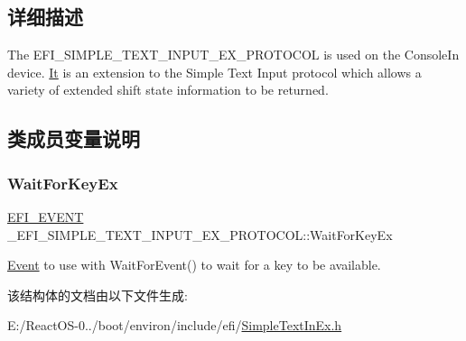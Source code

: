 \subsection{详细描述}
The E\+F\+I\+\_\+\+S\+I\+M\+P\+L\+E\+\_\+\+T\+E\+X\+T\+\_\+\+I\+N\+P\+U\+T\+\_\+\+E\+X\+\_\+\+P\+R\+O\+T\+O\+C\+OL is used on the Console\+In device. \hyperlink{class_it}{It} is an extension to the Simple Text Input protocol which allows a variety of extended shift state information to be returned. 

\subsection{类成员变量说明}
\mbox{\label{struct___e_f_i___s_i_m_p_l_e___t_e_x_t___i_n_p_u_t___e_x___p_r_o_t_o_c_o_l_a0279ca14f011ec16c3776440e3902235}} 
\subsubsection{\texorpdfstring{Wait\+For\+Key\+Ex}{WaitForKeyEx}}
{\footnotesize\ttfamily \hyperlink{_uefi_base_type_8h_a7f3111de303d836d8d3711c39363f81a}{E\+F\+I\+\_\+\+E\+V\+E\+NT} \+\_\+\+E\+F\+I\+\_\+\+S\+I\+M\+P\+L\+E\+\_\+\+T\+E\+X\+T\+\_\+\+I\+N\+P\+U\+T\+\_\+\+E\+X\+\_\+\+P\+R\+O\+T\+O\+C\+O\+L\+::\+Wait\+For\+Key\+Ex}

\hyperlink{struct_event}{Event} to use with Wait\+For\+Event() to wait for a key to be available. 

该结构体的文档由以下文件生成\+:\begin{DoxyCompactItemize}
\item 
E\+:/\+React\+O\+S-\/0../boot/environ/include/efi/\hyperlink{_simple_text_in_ex_8h}{Simple\+Text\+In\+Ex.\+h}\end{DoxyCompactItemize}
